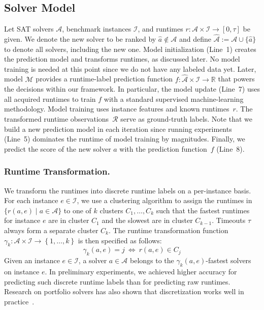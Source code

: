 \documentclass[runningheads]{llncs}
\begin{document}
\subsection{Solver Model}
\label{sec:main:model}

Let SAT solvers $\mathcal{A}$, benchmark instances $\mathcal{I}$, and runtimes $r : \mathcal{A} \times \mathcal{I} \rightarrow \left[0, \tau\right]$ be given.
We denote the new solver to be ranked by $\hat a \not\in \mathcal{A}$ and define $\mathcal{\hat A} := \mathcal{A} \cup \lbrace \hat a \rbrace$ to denote all solvers, including the new one.
Model initialization (Line~1) creates the prediction model and transforms runtimes, as discussed later.
No model training is needed at this point since we do not have any labeled data yet.
Later, model $\mathcal{M}$ provides a runtime-label prediction function $f : \mathcal{\hat A} \times \mathcal{I} \rightarrow \mathbb{R}$ that powers the decisions within our framework.
In particular, the model update (Line~7) uses all acquired runtimes to train $f$ with a standard supervised machine-learning methodology.
Model training uses instance features and known runtimes~$r$.
The transformed runtime observations~$\mathcal{R}$ serve as ground-truth labels.
Note that we build a new prediction model in each iteration since running experiments (Line~5) dominates the runtime of model training by magnitudes.
Finally, we predict the score of the new solver $\hat a$ with the prediction function~$f$ (Line~8).

\subsubsection{Runtime Transformation.}

We transform the runtimes into discrete runtime labels on a per-instance basis.
For each instance $e \in \mathcal{I}$, we use a clustering algorithm to assign the runtimes in $\bigl\{ r(a, e) \mid a \in \mathcal{A} \bigr\}$ to one of $k$ clusters $C_1, \dots, C_k$ such that the fastest runtimes for instance $e$ are in cluster $C_1$ and the slowest are in cluster $C_{k-1}$.
Timeouts $\tau$ always form a separate cluster $C_{k}$.
The runtime transformation function $\gamma_k : {\mathcal{A} \times \mathcal{I}} \rightarrow \left\lbrace 1, \dots, k \right\rbrace$ is then specified as follows:
%
$$\gamma_k(a, e) = j ~\Leftrightarrow~ r(a, e) \in C_j$$
%
Given an instance $e \in \mathcal{I}$, a solver $a \in \mathcal{A}$ belongs to the $\gamma_k(a, e)$-fastest solvers on instance $e$. 
In preliminary experiments, we achieved higher accuracy for predicting such discrete runtime labels than for predicting raw runtimes.
Research on portfolio solvers has also shown that discretization works well in practice~\cite{CollauttiMMO13,NgokoCT19}.
\end{document}
